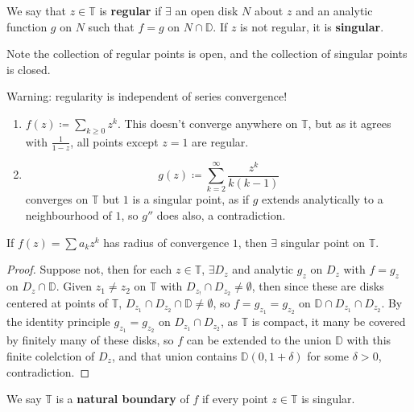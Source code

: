\documentclass{article}
\begin{document}
\begin{defi}
    We say that $z \in \mathbb{T}$ is \textbf{regular} if $\exists$ an open disk $N$ about $z$ and an analytic function $g$ on $N$ such that $f = g$ on $N \cap \mathbb{D}$. If $z$ is not regular, it is \textbf{singular}.
\end{defi}

Note the collection of regular points is open, and the collection of singular points is closed.

Warning: regularity is independent of series convergence!
\begin{enumerate}[label=(\arabic*)]
    \item $f(z) \coloneqq \sum_{k \geq 0} z^k$. This doesn't converge anywhere on $\mathbb{T}$, but as it agrees with $\frac1{1-z}$, all points except $z=1$ are regular.
    \item
        \begin{equation}
            g(z) \coloneqq \sum_{k=2}^\infty \frac{z^k}{k(k-1)}
        \end{equation}
        converges on $\mathbb{T}$ but $1$ is a singular point, as if $g$ extends analytically to a neighbourhood of $1$, so $g''$ does also, a contradiction.
\end{enumerate}

\begin{prop}
    If $f(z) = \sum a_k z^k$ has radius of convergence $1$, then $\exists$ singular point on $\mathbb{T}$.
\end{prop}

\begin{proof}
    Suppose not, then for each $z \in \mathbb{T}$, $\exists D_z$ and analytic $g_z$ on $D_z$ with $f = g_z$ on $D_z \cap \mathbb{D}$. Given $z_1 \neq z_2$ on $\mathbb{T}$ with $D_{z_!} \cap D_{z_2} \neq \emptyset$, then since these are disks centered at points of $\mathbb{T}$, $D_{z_1} \cap D_{z_2} \cap \mathbb{D} \neq \emptyset$, so $f = g_{z_1} = g_{z_2}$ on $\mathbb{D} \cap D_{z_1} \cap D_{z_2}$. By the identity principle $g_{z_1} = g_{z_2}$ on $D_{z_1} \cap D_{z_2}$, as $\mathbb{T}$ is compact, it many be covered by finitely many of these disks, so $f$ can be extended to the union $\mathbb{D}$ with this finite colelction of $D_z$, and that union contains $\mathbb{D}(0, 1 + \delta)$ for some $\delta > 0$, contradiction.
\end{proof}

\begin{defi}
    We say $\mathbb{T}$ is a \textbf{natural boundary} of $f$ if every point $z \in \mathbb{T}$ is singular.
\end{defi}
\end{document}
